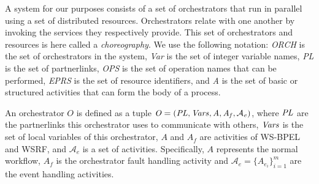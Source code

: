A system for our purposes consists of a set of orchestrators
that run in parallel using a set of distributed resources.
Orchestrators relate with one another by
invoking the services they respectively provide.
This set of orchestrators and resources is here called a {\em choreography}. We use the following notation: {\it ORCH} is the set of orchestrators in the system, {\it Var} is the set of integer variable names, {\it PL} is the set of partnerlinks, {\it OPS} is the set of operation names that can be performed, {\it EPRS} is the set of resource identifiers, and {\it A} is the set of basic or structured activities that can form the body of a process. 

An orchestrator $O$ is defined as a 
tuple ${\it O = ({\it PL}, {\it Vars}, A, A_f, \mathcal{A}_e)}$, 
where ${\it PL}$ are the partnerlinks this orchestrator 
uses to communicate with others, ${\it Vars}$ is the set of
local variables of this orchestrator,
$A$ and $A_f$ are activities of WS-BPEL and WSRF, 
and $\mathcal{A}_e$ is a set of activities. Specifically, $A$ 
represents the normal workflow, $A_f$ is the orchestrator fault 
handling activity and $\mathcal{A}_e=\{A_{e_{i}}\}_{i=1}^m$ are the 
event handling activities. 
